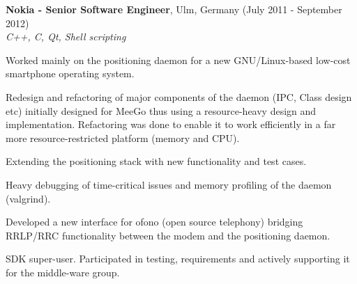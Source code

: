 \documentclass[alan.tex]{subfiles}
\begin{document}
\item \textbf{Nokia - Senior Software Engineer}, Ulm, Germany (July 2011 - September 2012)\\
  \emph{C++, C, Qt, Shell scripting}
  \begin{my_desc}
    \item[Worked] mainly on the positioning daemon for a new GNU/Linux-based low-cost smartphone operating system.
      \begin{my_bullets}
        \item Redesign and refactoring of major components of the daemon (IPC, Class design etc) initially designed for MeeGo thus using a resource-heavy design and implementation. Refactoring was done to enable it to work efficiently in a far more resource-restricted platform (memory and CPU).
        \item Extending the positioning stack with new functionality and test cases.
        \item Heavy debugging of time-critical issues and memory profiling of the daemon (valgrind).
      \end{my_bullets}
    \item[Developed] a new interface for ofono (open source telephony) bridging RRLP/RRC functionality between the modem and the positioning daemon.
    \item[SDK] super-user. Participated in testing, requirements and actively supporting it for the middle-ware group.
  \end{my_desc}
\end{document}
